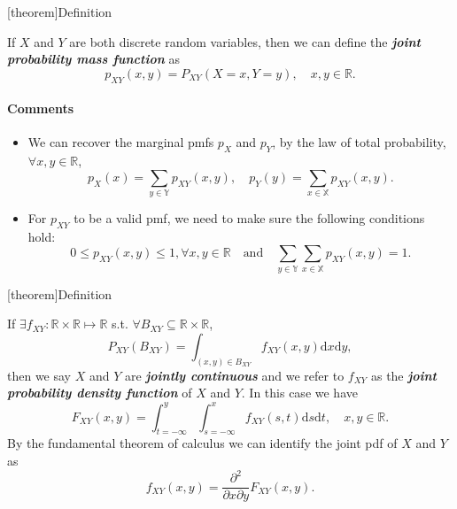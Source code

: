\documentclass[12pt]{report}
\theoremstyle{definition}
\begin{document}
[theorem]{Definition}
\begin{joint pmf}
    If $X$ and $Y$ are both discrete random variables, then we can define the
    \textbf{\emph{joint probability mass function}} as\[
        p_{XY}(x,y)=P_{XY}(X=x,Y=y),\quad x,y\in\mathbb{R}.
    \]
\end{joint pmf}
\paragraph{Comments}
\begin{itemize}
    \item We can recover the marginal pmfs $p_X$ and $p_Y$, by the law of total
        probability, $\forall x,y\in\mathbb{R}$,
        \[
            p_X(x)=\sum_{y\in\mathbb{Y}}p_{XY}(x,y),\quad 
            p_Y(y)=\sum_{x\in\mathbb{X}}p_{XY}(x,y).
        \]
    \item For $p_{XY}$ to be a valid pmf, we need to make sure the following
        conditions hold:
        \[
            0\le p_{XY}(x,y)\le 1,\forall x,y\in\mathbb{R}
            \quad\text{and}\quad
            \sum_{y\in\mathbb{Y}}\sum_{x\in\mathbb{X}}p_{XY}(x,y)=1.
        \]
\end{itemize} 

[theorem]{Definition}
\begin{joint pdf}
    If $\exists f_{XY}:\mathbb{R}\times\mathbb{R}\mapsto\mathbb{R}$ s.t.
    $\forall B_{XY}\subseteq\mathbb{R}\times\mathbb{R}$,
    \[
        P_{XY}(B_{XY})=\int_{(x,y)\in B_{XY}}f_{XY}(x,y)\mathrm{d}x\mathrm{d}y,
    \]
    then we say $X$ and $Y$ are \textbf{\emph{jointly continuous}} and we refer
    to $f_{XY}$ as the \textbf{\emph{joint probability density function}} of $X$
    and $Y$. In this case we have
    \[
        F_{XY}(x,y)=\int_{t=-\infty}^{y} \int_{s=-\infty}^{x}
        f_{XY}(s,t)\mathrm{d}s\mathrm{d}t,\quad x,y\in\mathbb{R}.
    \]
    By the fundamental theorem of calculus we can identify the
    joint pdf of $X$ and $Y$ as
    \[
        f_{XY}(x,y)=\frac{\partial^2}{\partial x\partial y}F_{XY}(x,y).
    \]
\end{joint pdf}
\end{document}
